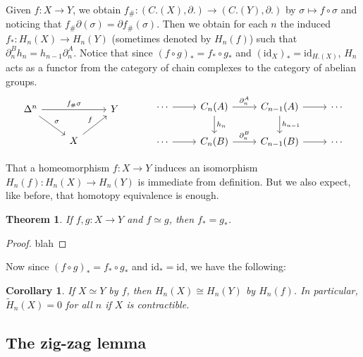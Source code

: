 \documentclass[11pt]{article}
\theoremstyle{definition}
\theoremstyle{plain}
\newtheorem*{corollary}{Corollary}
\newtheorem{theorem}{Theorem}[section]
\theoremstyle{remark}
\newcommand{\id}{\textrm{id}}
\begin{document}
Given $f:X\to Y$, we obtain $f_\#:(C.(X),\partial.)\to(C.(Y),\partial.)$ by $\sigma\mapsto f\circ\sigma$ and noticing that $f_\#\partial(\sigma)=\partial f_\#(\sigma)$. Then we obtain for each $n$ the induced $f_\ast:H_n(X)\to H_n(Y)$ (sometimes denoted by $H_n(f)$) such that $\partial_n^Bh_n=h_{n-1}\partial_n^A$. Notice that since $(f\circ g)_\ast=f_\ast\circ g_\ast$ and $(\id_X)_\ast=\id_{H.(X)}$, $H_n$ acts as a functor from the category of chain complexes to the category of abelian groups.
\[\begin{tikzcd}
\Delta^n\arrow{dr}{\sigma}\arrow{rr}{f_\#\sigma}&&Y\\
&X\arrow{ur}{f}
\end{tikzcd}\quad\quad\quad\begin{tikzcd}
\cdots\arrow{r}&C_n(A)\arrow{d}{h_n}\arrow{r}{\partial_n^A}&C_{n-1}(A)\arrow{d}{h_{n-1}}\arrow{r}&\cdots\\
\cdots\arrow{r}&C_n(B)\arrow{r}{\partial_n^B}&C_{n-1}(B)\arrow{r}&\cdots
\end{tikzcd}\]

That a homeomorphism $f:X\to Y$ induces an isomorphism $H_n(f):H_n(X)\to H_n(Y)$ is immediate from definition. But we also expect, like before, that homotopy equivalence is enough.\medbreak

\begin{theorem}
If $f,g:X\to Y$ and $f\simeq g$, then $f_\ast=g_\ast$.
\end{theorem}
\begin{proof}
blah
\end{proof}

Now since $(f\circ g)_\ast=f_\ast\circ g_\ast$ and $\id_\ast=\id$, we have the following:

\begin{corollary}
If $X\simeq Y$ by $f$, then $H_n(X)\cong H_n(Y)$ by $H_n(f)$. In particular,     $\widetilde{H}_n(X)=0$ for all $n$ if $X$ is contractible.
\end{corollary}

\subsection{The zig-zag lemma}\label{12}
\end{document}
